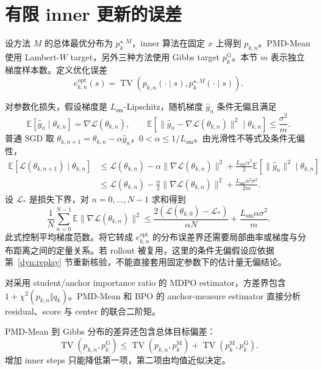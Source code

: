 \section{有限 inner 更新的误差}

设方法 $M$ 的总体最优分布为 $p_k^{\star,M}$，inner 算法在固定 $x$ 上得到 $p_{k,n}$。PMD-Mean 使用 Lambert-$W$ target，另外三种方法使用 Gibbs target $p_k^{\mathrm G}$。本节 $m$ 表示独立梯度样本数。定义优化误差
\begin{equation*}
e^{\mathrm{opt}}_{k,n}(s)=\operatorname{TV}\!\left(p_{k,n}(\cdot\mid s),p_k^{\star,M}(\cdot\mid s)\right).
\end{equation*}

对参数化损失，假设梯度是 $L_{\mathrm{sm}}$-Lipschitz，随机梯度 $\widehat g_n$ 条件无偏且满足
\begin{equation*}
\mathbb E[\widehat g_n\mid\theta_{k,n}]=\nabla\mathcal L(\theta_{k,n}),\qquad
\mathbb E\!\left[\|\widehat g_n-\nabla\mathcal L(\theta_{k,n})\|^2\mid\theta_{k,n}\right]\le\frac{\sigma^2}{m}.
\end{equation*}
普通 SGD 取 $\theta_{k,n+1}=\theta_{k,n}-\alpha\widehat g_n$，$0<\alpha\le 1/L_{\mathrm{sm}}$。由光滑性不等式及条件无偏性，
\begin{align*}
\mathbb E[\mathcal L(\theta_{k,n+1})\mid\theta_{k,n}]
&\le\mathcal L(\theta_{k,n})-\alpha\|\nabla\mathcal L(\theta_{k,n})\|^2
+\frac{L_{\mathrm{sm}}\alpha^2}{2}\mathbb E[\|\widehat g_n\|^2\mid\theta_{k,n}]\\
&\le\mathcal L(\theta_{k,n})-\frac\alpha2\|\nabla\mathcal L(\theta_{k,n})\|^2
+\frac{L_{\mathrm{sm}}\alpha^2\sigma^2}{2m}.
\end{align*}
设 $\mathcal L_*$ 是损失下界，对 $n=0,\ldots,N-1$ 求和得到
\begin{equation*}
\frac1N\sum_{n=0}^{N-1}\mathbb E\|\nabla\mathcal L(\theta_{k,n})\|^2
\le\frac{2(\mathcal L(\theta_{k,0})-\mathcal L_*)}{\alpha N}
+\frac{L_{\mathrm{sm}}\alpha\sigma^2}{m}.
\end{equation*}
此式控制平均梯度范数。将它转成 $e^{\mathrm{opt}}_{k,n}$ 的分布误差界还需要局部曲率或梯度与分布距离之间的定量关系。若 rollout 被复用，这里的条件无偏假设应依据第~\ref{dyn:replay} 节重新核验，不能直接套用固定参数下的估计量无偏结论。

对采用 student/anchor importance ratio 的 MDPO estimator，方差界包含 $1+\chi^2(p_{k,n}\Vert q_k)$。PMD-Mean 和 BPO 的 anchor-measure estimator 直接分析 residual、score 与 center 的联合二阶矩。

PMD-Mean 到 Gibbs 分布的差异还包含总体目标偏差：
\begin{equation*}
\operatorname{TV}(p_{k,n},p_k^{\mathrm G})
\le\operatorname{TV}(p_{k,n},p_k^{\mathrm M})
+\operatorname{TV}(p_k^{\mathrm M},p_k^{\mathrm G}).
\end{equation*}
增加 inner steps 只能降低第一项，第二项由均值近似决定。

